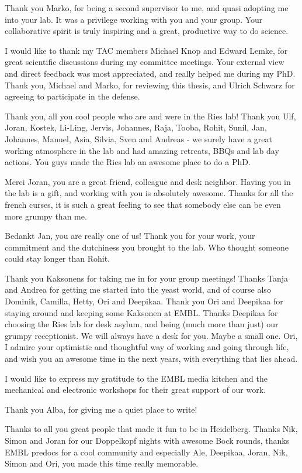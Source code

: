 \documentclass[
12pt, %
ngerman,
english, %
onehalfspacing,
hidelinks,
toctotoc, %
headsepline, %
]{MastersDoctoralThesis} %
\begin{document}
\begin{acknowledgements}
Thank you Marko, for being a second supervisor to me, and quasi adopting me into your lab. It was a privilege working with you and your group. Your collaborative spirit is truly inspiring and a great, productive way to do science. 

I would like to thank my TAC members Michael Knop and Edward Lemke, for great scientific discussions during my committee meetings. Your external view and direct feedback was most appreciated, and really helped me during my PhD. Thank you, Michael and Marko, for reviewing this thesis, and Ulrich Schwarz for agreeing to participate in the defense.

Thank you, all you cool people who are and were in the Ries lab! Thank you Ulf, Joran, Kostek, Li-Ling, Jervis, Johannes, Raja, Tooba, Rohit, Sunil, Jan, Johannes, Manuel, Asia, Silvia, Sven and Andreas - we surely have a great working atmosphere in the lab and had amazing retreats, BBQs and lab day actions. You guys made the Ries lab an awesome place to do a PhD.

Merci Joran, you are a great friend, colleague and desk neighbor. Having you in the lab is a gift, and working with you is absolutely awesome. Thanks for all the french curses, it is such a great feeling to see that somebody else can be even more grumpy than me.

Bedankt Jan, you are really one of us! Thank you for your work, your commitment and the dutchiness you brought to the lab. Who thought someone could stay longer than Rohit. 

Thank you Kaksonens for taking me in for your group meetings! Thanks Tanja and Andrea for getting me started into the yeast world, and of course also Dominik, Camilla, Hetty, Ori and Deepikaa. Thank you Ori and Deepikaa for staying around and keeping some Kaksonen at EMBL. Thanks Deepikaa for choosing the Ries lab for desk asylum, and being (much more than just) our grumpy receptionist. We will always have a desk for you. Maybe a small one. Ori, I admire your optimistic and thoughtful way of working and going through life, and wish you an awesome time in the next years, with everything that lies ahead.

I would like to express my gratitude to the EMBL media kitchen and the mechanical and electronic workshops for their great support of our work.

Thank you Alba, for giving me a quiet place to write!

Thanks to all you great people that made it fun to be in Heidelberg. Thanks Nik, Simon and Joran for our Doppelkopf nights with awesome Bock rounds, thanks EMBL predocs for a cool community and especially Ale, Deepikaa, Joran, Nik, Simon and Ori, you made this time really memorable.


\end{acknowledgements}
\end{document}
